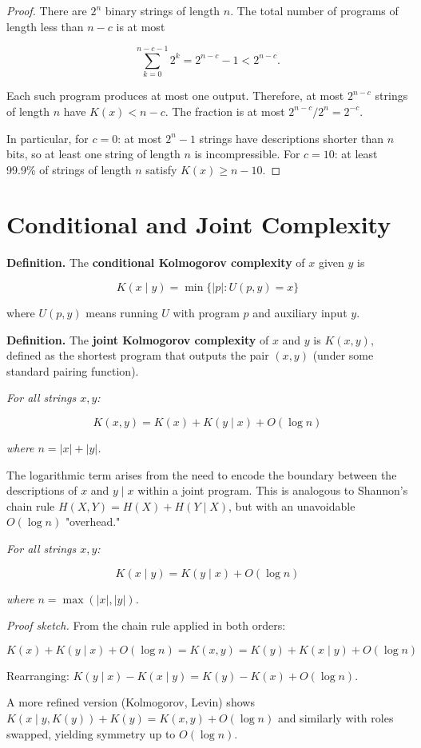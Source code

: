 \begin{proof}
There are $2^n$ binary strings of length $n$. The total number of programs of length less than $n - c$ is at most

\[\sum_{k=0}^{n-c-1} 2^k = 2^{n-c} - 1 < 2^{n-c}.\]

Each such program produces at most one output. Therefore, at most $2^{n-c}$ strings of length $n$ have $K(x) < n - c$. The fraction is at most $2^{n-c}/2^n = 2^{-c}$.

In particular, for $c = 0$: at most $2^n - 1$ strings have descriptions shorter than $n$ bits, so at least one string of length $n$ is incompressible. For $c = 10$: at least 99.9\% of strings of length $n$ satisfy $K(x) \geq n - 10$. 
\end{proof}

\section{Conditional and Joint Complexity}

\textbf{Definition.} The \textbf{conditional Kolmogorov complexity} of $x$ given $y$ is

\[K(x \mid y) = \min\{ |p| : U(p, y) = x\} \]

where $U(p, y)$ means running $U$ with program $p$ and auxiliary input $y$.

\textbf{Definition.} The \textbf{joint Kolmogorov complexity} of $x$ and $y$ is $K(x, y)$, defined as the shortest program that outputs the pair $(x, y)$ (under some standard pairing function).

\begin{theorem}
\textit{For all strings $x, y$:}

\[K(x, y) = K(x) + K(y \mid x) + O(\log n)\]

\textit{where $n = |x| + |y|$.}

The logarithmic term arises from the need to encode the boundary between the descriptions of $x$ and $y \mid x$ within a joint program. This is analogous to Shannon's chain rule $H(X, Y) = H(X) + H(Y \mid X)$, but with an unavoidable $O(\log n)$ "overhead."
\end{theorem}

\begin{theorem}
\textit{For all strings $x, y$:}

\[K(x \mid y) = K(y \mid x) + O(\log n)\]

\textit{where $n = \max(|x|, |y|)$.}

\textit{Proof sketch.} From the chain rule applied in both orders:

\[K(x) + K(y \mid x) + O(\log n) = K(x, y) = K(y) + K(x \mid y) + O(\log n)\]

Rearranging: $K(y \mid x) - K(x \mid y) = K(y) - K(x) + O(\log n)$.

A more refined version (Kolmogorov, Levin) shows $K(x \mid y, K(y)) + K(y) = K(x, y) + O(\log n)$ and similarly with roles swapped, yielding symmetry up to $O(\log n)$. 



\end{theorem}


